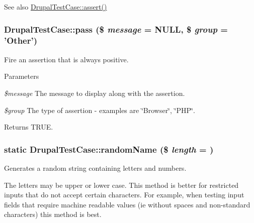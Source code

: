 \begin{DoxySeeAlso}{See also}
\hyperlink{class_drupal_test_case_ae4722b337aa79fcd753a2fc0c2f0b179}{DrupalTestCase::assert()} 
\end{DoxySeeAlso}
\hypertarget{class_drupal_test_case_a9ced458583ee9de3d82ab1cc09009a01}{
\subsubsection[{pass}]{\setlength{\rightskip}{0pt plus 5cm}DrupalTestCase::pass (\$ {\em message} = {\ttfamily NULL}, \/  \$ {\em group} = {\ttfamily 'Other'})}}
\label{class_drupal_test_case_a9ced458583ee9de3d82ab1cc09009a01}
Fire an assertion that is always positive.


\begin{DoxyParams}{Parameters}
\item[{\em \$message}]The message to display along with the assertion. \item[{\em \$group}]The type of assertion -\/ examples are \char`\"{}Browser\char`\"{}, \char`\"{}PHP\char`\"{}. \end{DoxyParams}
\begin{DoxyReturn}{Returns}
TRUE. 
\end{DoxyReturn}
\hypertarget{class_drupal_test_case_ab1137ec76434cdd38ec267977ba153d5}{
\subsubsection[{randomName}]{\setlength{\rightskip}{0pt plus 5cm}static DrupalTestCase::randomName (\$ {\em length} = {})}}
\label{class_drupal_test_case_ab1137ec76434cdd38ec267977ba153d5}
Generates a random string containing letters and numbers.

The letters may be upper or lower case. This method is better for restricted inputs that do not accept certain characters. For example, when testing input fields that require machine readable values (ie without spaces and non-\/standard characters) this method is best.


